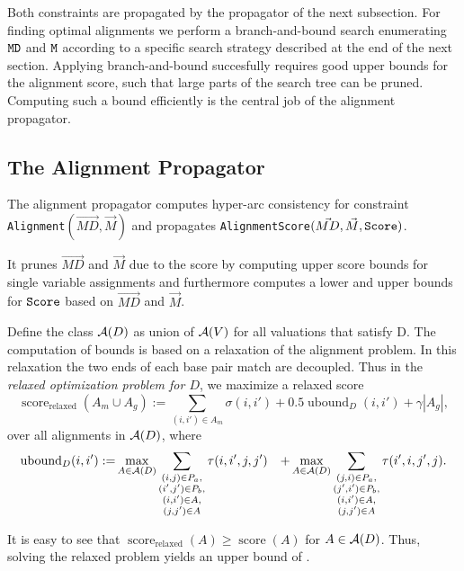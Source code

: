 \documentclass[11pt]{llncs}
\newcommand{\score}{\operatorname{score}}
\begin{document}
Both constraints are propagated by the propagator of the next
subsection. For finding optimal alignments we perform a
branch-and-bound search enumerating $\texttt{MD}$ and $\texttt{M}$ according
to a specific search strategy described at the end of the next
section. Applying branch-and-bound succesfully requires good upper
bounds for the alignment score, such that large parts of the search
tree can be pruned. Computing such a bound efficiently is the central
job of the alignment propagator.

\subsection{The Alignment Propagator}

The alignment propagator computes hyper-arc consistency for constraint
\texttt{Alignment}$(\vec{MD},\vec{M})$ and propagates
\texttt{AlignmentScore}$(\vec{MD},\vec{M},\texttt{Score})$.

It prunes $\vec{MD}$ and $\vec{M}$ due to the score by computing upper
score bounds for single variable assignments and furthermore computes
a lower and upper bounds for $\texttt{Score}$ based on $\vec{MD}$ and
$\vec{M}$.

Define the class ${\mathcal A}(D)$ as union of ${\mathcal A}(V)$ for all valuations that
satisfy D. The computation of bounds is based on a relaxation of the
alignment problem. In this relaxation the two ends of each base pair
match are decoupled. Thus in the \emph{relaxed optimization problem
  for $D$}, we maximize a relaxed score
 \begin{displaymath}
  \score_\text{relaxed}(A_m\cup A_g) :=
  \sum_{(i,i')\in A_m} 
  \sigma(i,i') + 0.5\operatorname{ubound}_D(i,i')
  + \gamma |A_g|,
\end{displaymath}
over all alignments in ${\mathcal A}(D)$, where
\begin{align*}
  \operatorname{ubound}_D(i,i') := & \max_{A\in{\mathcal A}(D)} \sum_{\substack{(i,j)\in P_a,\\(i',j')\in P_b,\\(i,i')\in A,\\(j,j')\in A}} \tau(i,i',j,j')
  & + \max_{A\in{\mathcal A}(D)} \sum_{\substack{(j,i)\in P_a,\\(j',i')\in P_b,\\(i,i')\in A,\\(j,j')\in A}} \tau(i',i,j',j).
\end{align*}

It is easy to see that $\score_\text{relaxed}(A) \geq \score(A)$ for
$A\in{\mathcal A}(D)$. Thus, solving the relaxed problem yields an upper bound
of . 
\end{document}
